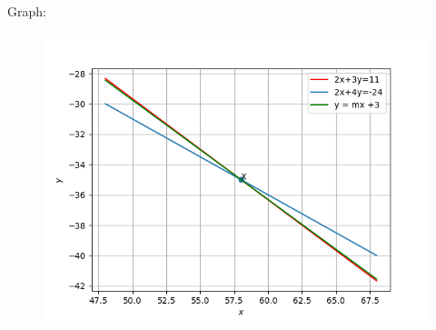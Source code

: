\documentclass[journal,12pt,onecolumn]{IEEEtran}
\begin{document}
Graph:
\begin{figure}[h!]
	\centering
	\includegraphics[width=\linewidth]{img.png}
\end{figure}	
\end{document}
